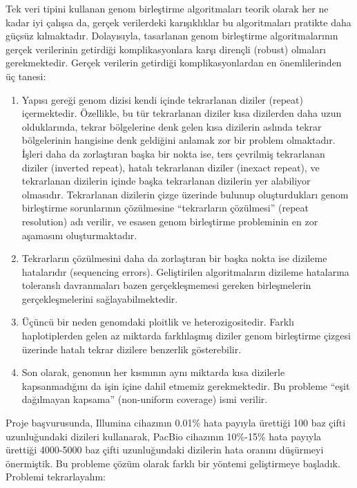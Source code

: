 \documentclass[11pt]{article}
\begin{document}
Tek veri tipini kullanan genom birleştirme algoritmaları teorik olarak her ne kadar iyi çalışsa da, gerçek verilerdeki karışıklıklar bu algoritmaları pratikte daha güçsüz kılmaktadır. Dolayısıyla, tasarlanan genom birleştirme algoritmalarının gerçek verilerinin getirdiği komplikasyonlara karşı dirençli (robust) olmaları gerekmektedir. Gerçek verilerin getirdiği komplikasyonlardan en önemlilerinden üç tanesi:

\begin{enumerate}
\item
  Yapısı gereği genom dizisi kendi içinde tekrarlanan diziler (repeat) içermektedir. Özellikle, bu tür tekrarlanan diziler kısa dizilerden daha uzun olduklarında, tekrar bölgelerine denk gelen kısa dizilerin aslında tekrar bölgelerinin hangisine denk geldiğini anlamak zor bir problem olmaktadır. İşleri daha da zorlaştıran başka bir nokta ise, ters çevrilmiş tekrarlanan diziler (inverted repeat), hatalı tekrarlanan diziler (inexact repeat), ve tekrarlanan dizilerin içinde başka tekrarlanan dizilerin yer alabiliyor olmasıdır. Tekrarlanan dizilerin çizge üzerinde bulunup oluşturdukları genom birleştirme sorunlarının çözülmesine ``tekrarların çözülmesi'' (repeat resolution) adı verilir, ve esasen genom birleştirme probleminin en zor aşamasını oluşturmaktadır.

\item
  Tekrarların çözülmesini daha da zorlaştıran bir başka nokta ise dizileme hatalarıdır (sequencing errors). Geliştirilen algoritmaların dizileme hatalarına toleranslı davranmaları bazen gerçekleşmemesi gereken birleşmelerin gerçekleşmelerini sağlayabilmektedir.

\item
  Üçüncü bir neden genomdaki ploitlik ve heterozigositedir. Farklı haplotiplerden gelen az miktarda farklılaşmış diziler genom birleştirme çizgesi üzerinde hatalı tekrar dizilere benzerlik gösterebilir.

\item
  Son olarak, genomun her kısmının aynı miktarda kısa dizilerle kapsanmadığını da işin içine dahil etmemiz gerekmektedir. Bu probleme ``eşit dağılmayan kapsama'' (non-uniform coverage) ismi verilir.

\end{enumerate}

Proje başvurusunda, Illumina cihazının 0.01\% hata payıyla ürettiği 100 baz çifti uzunluğundaki dizileri kullanarak, PacBio cihazının 10\%-15\% hata payıyla ürettiği 4000-5000 baz çifti uzunluğundaki dizilerin hata oranını düşürmeyi önermiştik. Bu probleme çözüm olarak farklı bir yöntemi geliştirmeye başladık. Problemi tekrarlayalım: 
\end{document}
